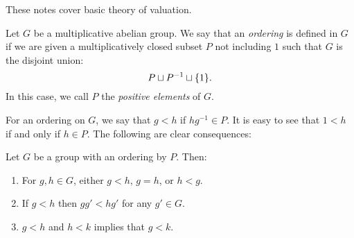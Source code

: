 These notes cover basic theory of valuation.

\begin{defn}
Let $G$ be a multiplicative abelian group. We say that an 
\emph{ordering} is defined in $G$ if we are given a 
multiplicatively closed subset $P$ not including $1$ such that 
$G$ is the disjoint union:
\[
P \sqcup P^{-1} \sqcup \{1\}.
\]
In this case, we call $P$ the \emph{positive elements} of $G$.
\end{defn}

For an ordering on $G$, we say that $g < h$ if $hg^{-1} \in P$.
It is easy to see that $1 < h$ if and only if $h \in P$. The
following are clear consequences:

\begin{prop}
Let $G$ be a group with an ordering by $P$. Then:

\begin{enumerate}
\item For $g, h \in G$, either $g < h$, $g = h$, or $h < g$.

\item If $g < h$ then $gg' < hg'$ for any $g' \in G$.

\item $g < h$ and $h < k$ implies that $g < k$.
\end{enumerate}
\end{prop}
